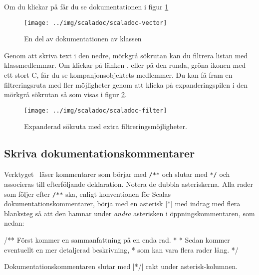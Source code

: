 Om du klickar på  får du se dokumentationen i figur  \ref{fig:scaladoc:vector}

\begin{figure}[H]
\centering
\texttt{[image: ../img/scaladoc/scaladoc-vector]}

     \caption{En del av dokumentationen av klassen }
    \label{fig:scaladoc:vector}
\end{figure}

Genom att skriva text i den nedre, mörkgrå sökrutan kan du filtrera listan med klassmedlemmar. Om klickar på länken , eller på den runda, gröna ikonen med ett stort C, får du se kompanjonsobjektets medlemmer.
Du kan få fram en filtreringsruta med fler möjligheter genom att klicka på expanderingspilen i den mörkgrå sökrutan så som visas i figur \ref{fig:scaladoc:filter}.



\begin{figure}[H]
\centering
\texttt{[image: ../img/scaladoc/scaladoc-filter]}

     \caption{Expanderad sökruta med extra filtreringsmöjligheter.}
    \label{fig:scaladoc:filter}
\end{figure}


\clearpage

\subsection{Skriva dokumentationskommentarer}


Verktyget \scaladoc\ läser kommentarer som börjar med \verb|/**| och slutar med \verb|*/| och associeras till efterföljande deklaration. Notera de dubbla asteriskerna. Alla rader som följer efter \verb|/**| ska, enligt konventionen för Scalas dokumentationskommentarer, börja med en asterisk \code|*| med indrag med flera blanksteg så att den hamnar under \textit{andra} asterisken i öppningskommentaren, som nedan:
\begin{Code}
/** Först kommer en sammanfattning på en enda rad.
  *
  * Sedan kommer eventuellt en mer detaljerad beskrivning,
  * som kan vara flera rader lång.
  */
\end{Code}
Dokumentationskommentaren slutar med \code|*/| rakt under asterisk-kolumnen.

